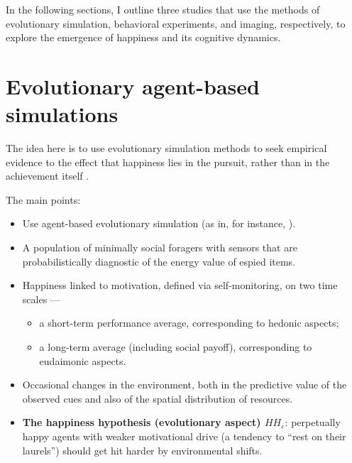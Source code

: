 \documentclass[11pt]{article}
\begin{document}
\noindent
In the following sections, I outline three studies that use the
methods of evolutionary simulation, behavioral experiments, and
imaging, respectively, to explore the emergence of happiness and its
cognitive dynamics. 

\section{Evolutionary agent-based simulations}

The idea here is to use evolutionary simulation methods to seek
empirical evidence to the effect that happiness lies in the pursuit,
rather than in the achievement itself \citep{Edelman12thop}.

\noindent
The main points:

\begin{itemize}

  \item Use agent-based evolutionary simulation (as in, for instance,
    \citealp*{RogersEtAl11}).

  \item A population of minimally social foragers with sensors that
    are probabilistically diagnostic of the energy value of espied
    items.

  \item Happiness linked to motivation, defined via self-monitoring,
    on two time scales --- 
    
    \begin{itemize}

      \item a short-term performance average, corresponding to hedonic
        aspects;

      \item a long-term average (including social payoff),
        corresponding to eudaimonic aspects.

    \end{itemize}

  \item Occasional changes in the environment, both in the predictive
    value of the observed cues and also of the spatial distribution of
    resources.

  \item \textbf{The happiness hypothesis (evolutionary aspect)
    $HH_e$}: perpetually happy agents with weaker motivational drive
    (a tendency to ``rest on their laurels'') should get hit harder by
    environmental shifts.

\end{itemize}
\end{document}
